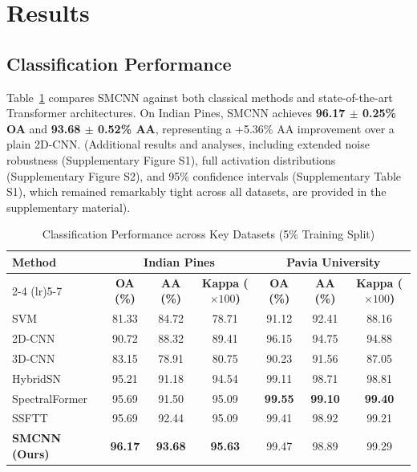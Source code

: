 \documentclass[pdflatex,sn-mathphys-num]{sn-jnl}
\theoremstyle{thmstyleone}
\theoremstyle{thmstyletwo}
\theoremstyle{thmstylethree}
\begin{document}
\section{Results}
\subsection{Classification Performance}
Table~\ref{tab:main_results} compares SMCNN against both classical methods and state-of-the-art Transformer architectures. On Indian Pines, SMCNN achieves \textbf{96.17 $\pm$ 0.25\% OA} and \textbf{93.68 $\pm$ 0.52\% AA}, representing a +5.36\% AA improvement over a plain 2D-CNN. (Additional results and analyses, including extended noise robustness (Supplementary Figure S1), full activation distributions (Supplementary Figure S2), and 95\% confidence intervals (Supplementary Table S1), which remained remarkably tight across all datasets, are provided in the supplementary material).

\begin{table}[!t]
\caption{Classification Performance across Key Datasets (5\% Training Split)}
\label{tab:main_results}
\centering
\begin{tabular}{lcccccc}
\toprule
\multirow{2}{*}{\textbf{Method}} & \multicolumn{3}{c}{\textbf{Indian Pines}} & \multicolumn{3}{c}{\textbf{Pavia University}} \\
\cmidrule(lr){2-4} \cmidrule(lr){5-7}
& \textbf{OA (\%)} & \textbf{AA (\%)} & \textbf{Kappa ($\times 100$)} & \textbf{OA (\%)} & \textbf{AA (\%)} & \textbf{Kappa ($\times 100$)} \\
\midrule
SVM~\cite{melgani2004classification} & 81.33 & 84.72 & 78.71 & 91.12 & 92.41 & 88.16 \\
2D-CNN & 90.72 & 88.32 & 89.41 & 96.15 & 94.75 & 94.88 \\
3D-CNN & 83.15 & 78.91 & 80.75 & 90.23 & 91.56 & 87.05 \\
HybridSN & 95.21 & 91.18 & 94.54 & 99.11 & 98.71 & 98.81 \\
SpectralFormer~\cite{sun2025advances} & 95.69 & 91.50 & 95.09 & \textbf{99.55} & \textbf{99.10} & \textbf{99.40} \\
SSFTT & 95.69 & 92.44 & 95.09 & 99.41 & 98.92 & 99.21 \\
\textbf{SMCNN (Ours)} & \textbf{96.17} & \textbf{93.68} & \textbf{95.63} & 99.47 & 98.89 & 99.29 \\
\bottomrule
\end{tabular}
\end{table}
\end{document}

